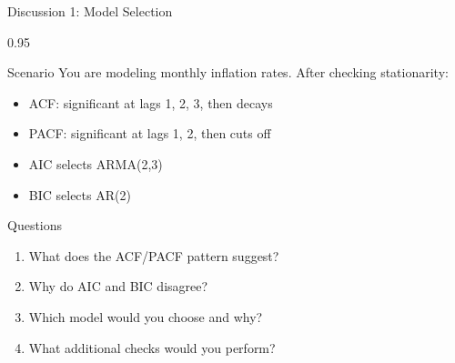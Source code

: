 \documentclass[9pt, aspectratio=169, t]{beamer}
\begin{document}
\begin{frame}{Discussion 1: Model Selection}
    \begin{cminipage}{0.95\textwidth}
    \begin{block}{Scenario}
        You are modeling monthly inflation rates. After checking stationarity:
        \begin{itemize}\setlength{\itemsep}{0pt}
            \item ACF: significant at lags 1, 2, 3, then decays
            \item PACF: significant at lags 1, 2, then cuts off
            \item AIC selects ARMA(2,3)
            \item BIC selects AR(2)
        \end{itemize}
    \end{block}

    \vspace{0.2cm}
    \begin{alertblock}{Questions}
        \begin{enumerate}\setlength{\itemsep}{0pt}
            \item What does the ACF/PACF pattern suggest?
            \item Why do AIC and BIC disagree?
            \item Which model would you choose and why?
            \item What additional checks would you perform?
        \end{enumerate}
    \end{alertblock}
    \end{cminipage}
\end{frame}
\end{document}
